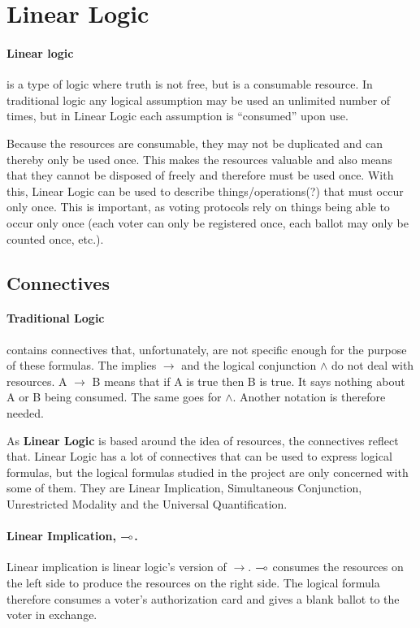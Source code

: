 \section{Linear Logic}
\label{LL}

\paragraph{Linear logic} is a type of logic where truth is not free, but is a consumable resource. In traditional logic any logical assumption may be used an unlimited number of times, but in Linear Logic each assumption is “consumed” upon use.

Because the resources are consumable, they may not be duplicated and can thereby only be used once. This makes the resources valuable and also means that they cannot be disposed of freely and therefore must be used once. With this, Linear Logic can be used to describe things/operations(?) that must occur only once. This is important, as voting protocols rely on things being able to occur only once (each voter can only be registered once, each ballot may only be counted once, etc.).

\subsection{Connectives}
\label{LL_01}

\paragraph{Traditional Logic} contains connectives that, unfortunately, are not specific enough for the purpose of these formulas. The implies $\rightarrow$ and the logical conjunction $\wedge$ do not deal with resources. A $\rightarrow$ B means that if A is true then B is true. It says nothing about A or B being consumed. The same goes for $\wedge$. Another notation is therefore needed. 

As \textbf{Linear Logic} is based around the idea of resources, the connectives reflect that. Linear Logic has a lot of connectives that can be used to express logical formulas, but the logical formulas studied in the project are only concerned with some of them. They are Linear Implication, Simultaneous Conjunction, Unrestricted Modality and the Universal Quantification.

\paragraph{Linear Implication, $\multimap$.} Linear implication is linear logic’s version of $\rightarrow$. $\multimap$ consumes the resources on the left side to produce the resources on the right side. The logical formula
therefore consumes a voter’s authorization card and gives a blank ballot to the voter in exchange.

